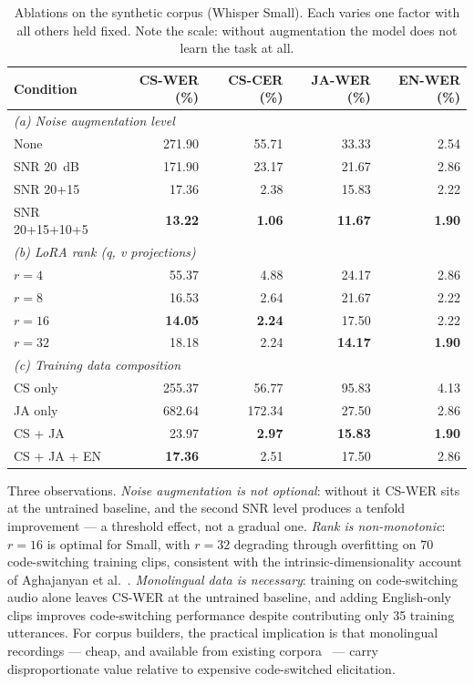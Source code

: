 \documentclass[11pt,a4paper]{article}
\newcommand{\best}[1]{\textbf{#1}}
\begin{document}
\begin{table}[t]
\centering
\caption{Ablations on the synthetic corpus (Whisper Small). Each varies one factor
with all others held fixed. Note the scale: without augmentation the model does
not learn the task at all.}
\label{tab:ablations}
\small
\begin{tabular}{lrrrr}
\toprule
Condition & CS-WER (\%) & CS-CER (\%) & JA-WER (\%) & EN-WER (\%) \\
\midrule
\multicolumn{5}{l}{\emph{(a) Noise augmentation level}} \\
\quad None                        & 271.90 & 55.71 & 33.33 & 2.54 \\
\quad SNR \SI{20}{\deci\bel}      & 171.90 & 23.17 & 21.67 & 2.86 \\
\quad SNR 20{+}15                 &  17.36 &  2.38 & 15.83 & 2.22 \\
\quad SNR 20{+}15{+}10{+}5        & \best{13.22} & \best{1.06} & \best{11.67} & \best{1.90} \\
\midrule
\multicolumn{5}{l}{\emph{(b) LoRA rank (q, v projections)}} \\
\quad $r=4$                       & 55.37 & 4.88 & 24.17 & 2.86 \\
\quad $r=8$                       & 16.53 & 2.64 & 21.67 & 2.22 \\
\quad $r=16$                      & \best{14.05} & \best{2.24} & 17.50 & 2.22 \\
\quad $r=32$                      & 18.18 & 2.24 & \best{14.17} & \best{1.90} \\
\midrule
\multicolumn{5}{l}{\emph{(c) Training data composition}} \\
\quad CS only                     & 255.37 & 56.77 & 95.83 & 4.13 \\
\quad JA only                     & 682.64 & 172.34 & 27.50 & 2.86 \\
\quad CS {+} JA                   &  23.97 & \best{2.97} & \best{15.83} & \best{1.90} \\
\quad CS {+} JA {+} EN            & \best{17.36} & 2.51 & 17.50 & 2.86 \\
\bottomrule
\end{tabular}
\end{table}

Three observations. \emph{Noise augmentation is not optional}: without it CS-WER
sits at the untrained baseline, and the second SNR level produces a tenfold
improvement --- a threshold effect, not a gradual one. \emph{Rank is non-monotonic}:
$r=16$ is optimal for Small, with $r=32$ degrading through overfitting on 70
code-switching training clips, consistent with the intrinsic-dimensionality
account of Aghajanyan et al.~\cite{aghajanyan2020intrinsic}. \emph{Monolingual
data is necessary}: training on code-switching audio alone leaves CS-WER at the
untrained baseline, and adding English-only clips improves code-switching
performance despite contributing only 35 training utterances. For corpus
builders, the practical implication is that monolingual recordings --- cheap, and
available from existing corpora~\cite{sonobe2017jsut,panayotov2015librispeech} ---
carry disproportionate value relative to expensive code-switched elicitation.
\end{document}
